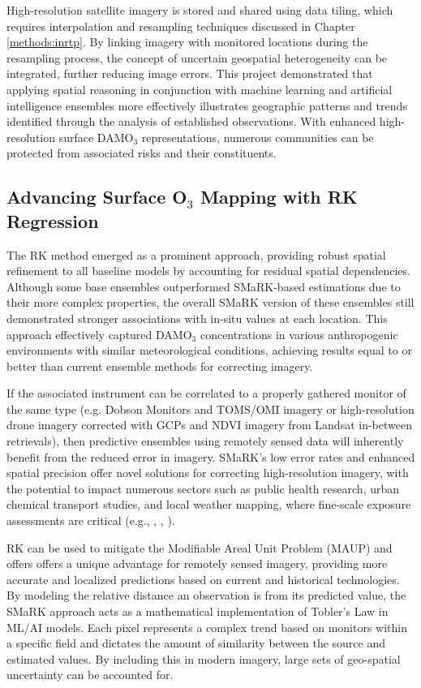 High-resolution satellite imagery is stored and shared using data tiling, which requires interpolation and resampling techniques discussed in Chapter \ref{methods:inrtp}. By linking imagery with monitored locations during the resampling process, the concept of uncertain geospatial heterogeneity can be integrated, further reducing image errors. This project demonstrated that applying spatial reasoning in conjunction with machine learning and artificial intelligence ensembles more effectively illustrates geographic patterns and trends identified through the analysis of established observations. With enhanced high-resolution surface DAMO$_3$ representations, numerous communities can be protected from associated risks and their constituents. %
\subsection{Advancing Surface O$_3$ Mapping with RK Regression} \label{clcsn:advanceRK} The RK method emerged as a prominent approach, providing robust spatial refinement to all baseline models by accounting for residual spatial dependencies. Although some base ensembles outperformed SMaRK-based estimations due to their more complex properties, the overall SMaRK version of these ensembles still demonstrated stronger associations with in-situ values at each location. This approach effectively captured DAMO$_3$ concentrations in various anthropogenic environments with similar meteorological conditions, achieving results equal to or better than current ensemble methods for correcting imagery. 

If the associated instrument can be correlated to a properly gathered monitor of the same type (e.g. Dobson Monitors and TOMS/OMI imagery or high-resolution drone imagery corrected with GCPs and NDVI imagery from Landsat in-between retrievals), then predictive ensembles using remotely sensed data will inherently benefit from the reduced error in imagery. SMaRK’s low error rates and enhanced spatial precision offer novel solutions for correcting high-resolution imagery, with the potential to impact numerous sectors such as public health research, urban chemical transport studies, and local weather mapping, where fine-scale exposure assessments are critical (e.g., \cite{kong_unraveling_2023}, \cite{lo_elevated_2024}, \cite{yin_trend_2019}).

RK can be used to mitigate the Modifiable Areal Unit Problem (MAUP) and offers offers a unique advantage for remotely sensed imagery, providing more accurate and localized predictions based on current and historical technologies. By modeling the relative distance an observation is from its predicted value, the SMaRK approach acts as a mathematical implementation of Tobler’s Law in ML/AI models. Each pixel represents a complex trend based on monitors within a specific field and dictates the amount of similarity between the source and estimated values. By including this in modern imagery, large sets of geo-spatial uncertainty can be accounted for.
